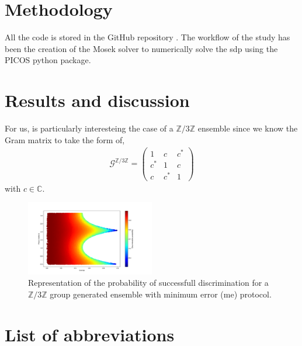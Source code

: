 \documentclass[12pt,letterpaper]{article}
\begin{document}
\begin{multicols}{2}
\section{Methodology}
All the code is stored in the GitHub repository \cite{GitHub}. The workflow of the study has been the creation of the Mosek solver \cite{mosek_sdp} to numerically solve the \gls{sdp} using the PICOS python package\cite{PICOS}.

\section{Results and discussion}

For us, is particularly interesteing the case of a $\mathbb{Z}/3\mathbb{Z}$ ensemble since we know the Gram matrix to take the form of,
\begin{align*}
	\mathcal{G}^{\mathbb{Z}/3\mathbb{Z}}=\begin{pmatrix}
		1 & c & c^*\\
		c^* & 1 & c\\
		c & c^* & 1
	\end{pmatrix}
\end{align*}
with $c\in\mathbb{C}$.


\begin{figure}[H]
	\centering
	\caption{Representation of the probability of successfull discrimination for a $\mathbb{Z}/3\mathbb{Z}$ group generated ensemble with minimum error (\gls{me}) protocol.}
	\includegraphics[width=0.5\textwidth, trim={3.3cm 0.8cm 4.5cm 2cm}, clip]{../Plots/DiscriminationOverlapVSPhaseVSMinimumErrorProbabilityZ3HeatMap.pdf}
\end{figure}



 
\section*{List of abbreviations}
\renewcommand{\glsnamefont}[1]{\textbf{#1}}
\printnoidxglossary[type=main, title={\vspace{-1cm}}, nonumberlist, nogroupskip, style=super]


\end{multicols}
\end{document}

